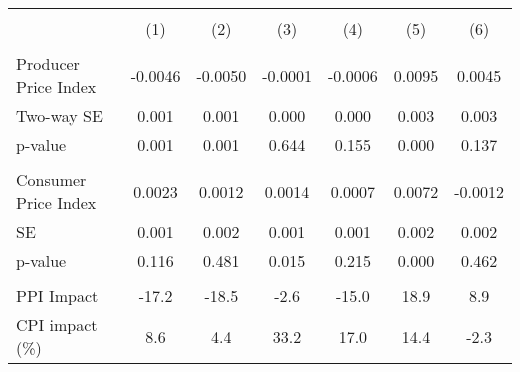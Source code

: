 {
\def\sym#1{\ifmmode^{#1}\else\(^{#1}\)\fi}
\begin{tabular}{l*{6}{c}}
\hline\hline
                    &&&\\\cmidrule(lr){2-3}\cmidrule(lr){4-5}\cmidrule(lr){6-7}
                    &         &         &         &         &         &         \\
\hline
\hline
\\ Producer Price Index&     -0.0046         &     -0.0050         &     -0.0001         &     -0.0006         &      0.0095         &      0.0045         \\
\hspace{15pt} Two-way SE &       0.001         &       0.001         &       0.000         &       0.000         &       0.003         &       0.003         \\
\hspace{15pt} p-value&       0.001         &       0.001         &       0.644         &       0.155         &       0.000         &       0.137         \\
\\ Consumer Price Index&      0.0023         &      0.0012         &      0.0014         &      0.0007         &      0.0072         &     -0.0012         \\
\hspace{15pt} SE    &       0.001         &       0.002         &       0.001         &       0.001         &       0.002         &       0.002         \\
\hspace{15pt} p-value&       0.116         &       0.481         &       0.015         &       0.215         &       0.000         &       0.462         \\
\hline \\ PPI Impact&       -17.2         &       -18.5         &        -2.6         &       -15.0         &        18.9         &         8.9         \\
CPI impact (\%)     &         8.6         &         4.4         &        33.2         &        17.0         &        14.4         &        -2.3         \\

\end{tabular}}

